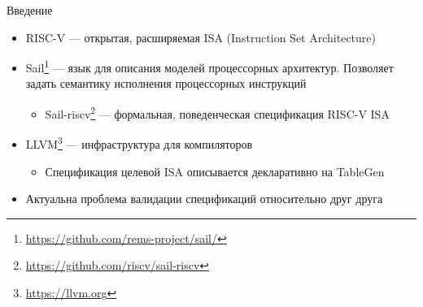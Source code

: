 \documentclass
  [ russian
  , aspectratio=169 %
  ] {beamer}
\begin{document}

\begin{frame}{Введение}
    \begin{itemize}
        \item RISC-V --- открытая, расширяемая ISA (Instruction Set Architecture)

        \item Sail\footnote[frame]{\url{https://github.com/rems-project/sail/}} --- язык для описания моделей процессорных архитектур. Позволяет задать семантику исполнения процессорных инструкций
              \begin{itemize}
                  \item Sail-riscv\footnote[frame]{\url{https://github.com/riscv/sail-riscv}} --- формальная, поведенческая спецификация RISC-V ISA
              \end{itemize}

        \item LLVM\footnote[frame]{\url{https://llvm.org}} --- инфраструктура для компиляторов
              \begin{itemize}
                  \item Спецификация целевой ISA описывается декларативно на TableGen
              \end{itemize}

        \item Актуальна проблема валидации спецификаций относительно друг друга
    \end{itemize}
\end{frame}
\end{document}
